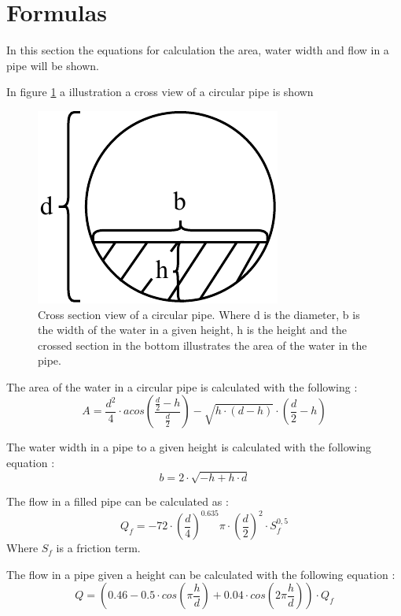 \newpage
\section{Formulas}\label{app:formulas}
In this section the equations for calculation the area, water width and flow in a pipe will be shown.
%


In figure \ref{fig:calc_water_pipe_width} a illustration a cross view of a circular pipe is shown
\begin{figure}[H]
	\centering
	\includegraphics[width=0.20\textheight]{report/appendix/figures/calc_water_pipe_width.pdf}
	\caption{Cross section view of a circular pipe. Where d is the diameter, b is the width of the water in a given height, h is the height and the crossed section in the bottom illustrates the area of the water in the pipe.}
	\label{fig:calc_water_pipe_width}
\end{figure}

The area of the water in a circular pipe is calculated with the following \cite{ikke_stationear}: 
\begin{equation}%
	A = \frac {d^2}{4} \cdot acos \left(\frac{\frac{d}{2}-h}{\frac{d}{2}}\right)-\sqrt{h\cdot (d-h)}\cdot  \left(\frac{d}{2}-h\right)
\end{equation}

The water width in a pipe to a given height is calculated with the following equation \cite{ikke_stationear}:
\begin{equation}
	b = 2 \cdot \sqrt{-h+h\cdot d}
\end{equation}

The flow in a filled pipe can be calculated as \cite{ikke_stationear}:
\begin{equation}%
	Q_f =-72\cdot \left(\frac{d}{4}\right)^{0.635}\pi\cdot\left(\frac{d}{2}\right)^2\cdot S_f^{0,5}%
\end{equation}
Where $S_f$ is a friction term. 

The flow in a pipe given a height can be calculated with the following equation \cite{ikke_stationear}:
\begin{equation}%
 	Q = \left(0.46-0.5 \cdot cos\left(\pi \frac{h}{d}\right)+0.04\cdot cos\left(2\pi\frac{h}{d}\right)\right)\cdot Q_f
\end{equation}

